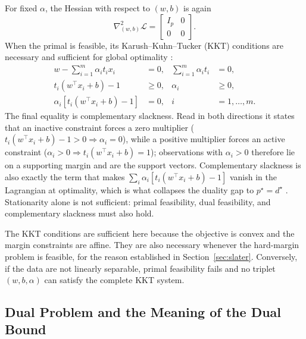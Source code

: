 \documentclass[11pt,a4paper]{article}
\numberwithin{equation}{section} %
\begin{document}
For fixed $\alpha$, the Hessian with respect to $(w,b)$ is again
\begin{equation}
    \nabla^2_{(w,b)}\mathcal{L}
    =\begin{bmatrix}I_p&0\\0&0\end{bmatrix}.
\end{equation}
When the primal is feasible, its Karush--Kuhn--Tucker (KKT) conditions are necessary and sufficient for global optimality \cite{boyd2004,lec-firstorder}:
\begin{equation}
\begin{aligned}
    w-\sum_{i=1}^{m}\alpha_i t_i x_i &=0,
    &\sum_{i=1}^{m}\alpha_i t_i &=0,\\
    t_i(w^\top x_i+b)-1 &\geq0,
    &\alpha_i &\geq0,\\
    \alpha_i\left[t_i(w^\top x_i+b)-1\right]&=0,
    & i&=1,\ldots,m.
\end{aligned}
\end{equation}
The final equality is complementary slackness. Read in both directions it states that an inactive constraint forces a zero multiplier ($t_i(w^\top x_i+b)-1>0\Rightarrow\alpha_i=0$), while a positive multiplier forces an active constraint ($\alpha_i>0\Rightarrow t_i(w^\top x_i+b)=1$); observations with $\alpha_i>0$ therefore lie on a supporting margin and are the support vectors. Complementary slackness is also exactly the term that makes $\sum_i\alpha_i[t_i(w^\top x_i+b)-1]$ vanish in the Lagrangian at optimality, which is what collapses the duality gap to $p^\star=d^\star$ \cite{lec-duality}. Stationarity alone is not sufficient: primal feasibility, dual feasibility, and complementary slackness must also hold.

The KKT conditions are sufficient here because the objective is convex and
the margin constraints are affine. They are also necessary whenever the
hard-margin problem is feasible, for the reason established in
Section~\ref{sec:slater}. Conversely, if the data are not linearly separable,
primal feasibility fails and no triplet $(w,b,\alpha)$ can satisfy the
complete KKT system.

\subsection{Dual Problem and the Meaning of the Dual Bound}
\end{document}
